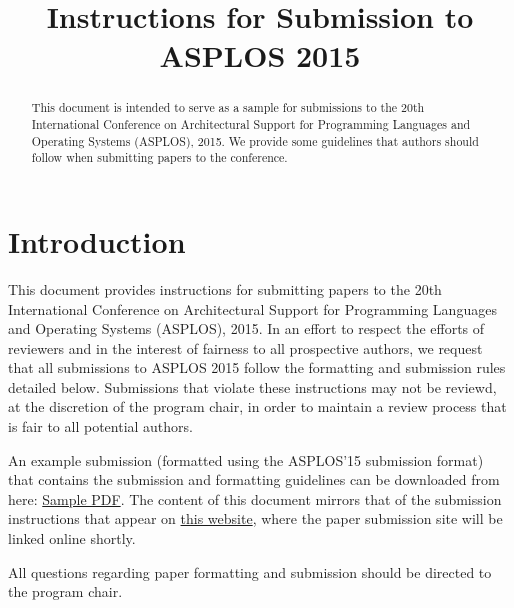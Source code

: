 \documentclass[pageno]{jpaper}
\begin{document}
\title{
Instructions for Submission to ASPLOS 2015}

\date{}
\maketitle

\thispagestyle{empty}

\begin{abstract}

This document is intended to serve as a sample for submissions to the 20th
International Conference on Architectural Support for Programming Languages
and Operating Systems (ASPLOS), 2015.  We provide some guidelines that 
authors should follow when submitting papers to the conference. 

\end{abstract}

\section{Introduction}

This document provides instructions for submitting papers to the 20th
International Conference on Architectural Support for Programming Languages
and Operating Systems (ASPLOS), 2015.  
In an effort to respect the efforts of reviewers 
and in the interest of fairness to all prospective authors, we request 
that all submissions to ASPLOS 2015 follow the formatting and submission 
rules detailed below. Submissions that violate these instructions may 
not be reviewd, at the discretion of the program chair, in order to 
maintain a review process that is fair to all potential authors. 

An example submission (formatted using the ASPLOS'15 submission format)
that contains the submission and formatting guidelines can be downloaded
from here:
\href{http:///files/asplos15-template.pdf}{Sample
PDF}. The content of this document mirrors that of the
submission instructions that appear on
\href{http://asplos15.bilkent.edu.tr/submission.html}{this website}, where    
the paper submission site will be linked online shortly. 

All questions regarding paper formatting and submission should be directed
to the program chair.
\end{document}
